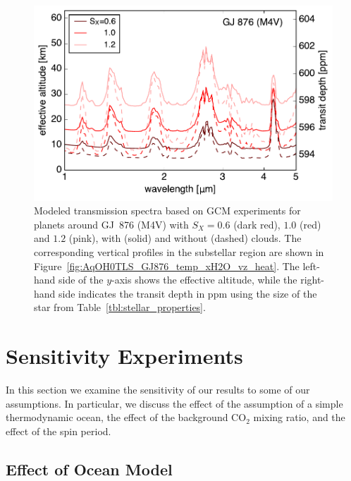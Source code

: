 \documentclass[11pt,numberedappendix,twocolappendix,]{emulateapj}
\begin{document}
\begin{figure}[!h]
    \begin{center}
    \includegraphics[width=\hsize]{transit_GJ876.pdf}
    \end{center}
\caption{Modeled transmission spectra based on GCM experiments for planets around GJ~876 (M4V) with $S_X=0.6$ (dark red), $1.0$ (red) and $1.2$ (pink), with (solid) and without (dashed) clouds. The corresponding vertical profiles in the substellar region are shown in Figure~\ref{fig:AqOH0TLS_GJ876_temp_xH2O_vz_heat}. The left-hand side of the $y$-axis shows the effective altitude, while the right-hand side indicates the transit depth in ppm using the size of the star from Table~\ref{tbl:stellar_properties}.}
\label{fig:transmission}
\end{figure}


\section{Sensitivity Experiments }
\label{s:sensitivity}

In this section we examine the sensitivity of our results to some of our assumptions. 
In particular, we discuss the effect of the assumption of a simple thermodynamic ocean, the effect of the background CO$_2$ mixing ratio, and the effect of the spin period. 


\subsection{Effect of Ocean Model}
\label{ss:sensitivity_ocean}
\end{document}
